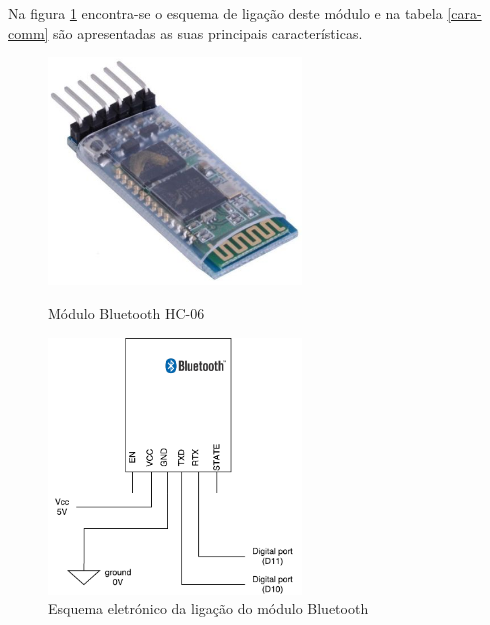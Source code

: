 Na figura \ref{comimageesquema} encontra-se o esquema de ligação deste módulo e na tabela \ref{cara-comm} são apresentadas as suas principais características.

\newpage

\begin{figure}[h]
	\centering
	\begin{minipage}[b]{0.49\textwidth}
		\centering
		\includegraphics[width=0.6\textwidth]{img/hardware/bluetooth_zs-040.png}
		\caption{Módulo Bluetooth HC-06}
		\label{comimage}
	\end{minipage}
	\hfill
	\begin{minipage}[b]{0.49\textwidth}
		\centering
		\includegraphics[width=0.6\textwidth]{img/comm-blue/electronic-sensors.pdf}
		\caption{Esquema eletrónico da ligação do módulo Bluetooth}
		\label{comimageesquema}
	\end{minipage}
\end{figure}



